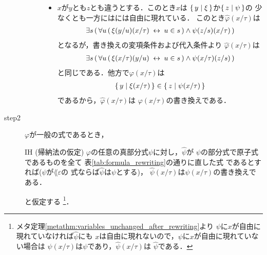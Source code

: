 \begin{metaprf}[第一]
\begin{description}
\begin{description}
\begin{itemize}
							\item $x$が$y$とも$z$とも違うとする．このとき$x$は
								$\{\, y \mid \xi\, \}$か$\{\, z \mid \psi\, \}$の
								少なくとも一方にはには自由に現れている．
								このとき$\widehat{\varphi}(x/\tau)$は
								\begin{align}
									\exists s\, (\, \forall u\, (\, \xi(y/u)(x/\tau) \hspace{0.25em}\leftrightarrow\hspace{0.25em} u \in s\, ) \wedge \psi(z/s)(x/\tau)\, )
								\end{align}
								となるが，書き換えの変項条件および代入条件より
								$\widehat{\varphi}(x/\tau)$は
								\begin{align}
									\exists s\, (\, \forall u\, (\, \xi(x/\tau)(y/u) \hspace{0.25em}\leftrightarrow\hspace{0.25em} u \in s\, ) \wedge \psi(x/\tau)(z/s)\, )
								\end{align}
								と同じである．他方で$\varphi(x/\tau)$は
								\begin{align}
									\{\, y \mid \xi(x/\tau)\, \} \in \{\, z \mid \psi(x/\tau)\, \}
								\end{align}
								であるから，$\widehat{\varphi}(x/\tau)$は
								$\varphi(x/\tau)$の書き換えである．
						\end{itemize}
				\end{description}
			
			\item[step2] $\varphi$が一般の式であるとき，
				\begin{itembox}[l]{IH (帰納法の仮定)}
					$\varphi$の任意の真部分式$\psi$に対し，$\widehat{\psi}$が
					$\psi$の部分式で原子式であるものを全て
					表\ref{tab:formula_rewriting}の通りに直した式
					であるとすれば($\psi$が$\lang{\varepsilon}$の
					式ならば$\widehat{\psi}$は$\psi$とする)，
					$\widehat{\psi}(x/\tau)$は$\psi(x/\tau)$の書き換えである．
				\end{itembox}
				と仮定する
				\footnote{
					メタ定理\ref{metathm:variables_unchanged_after_rewriting}より
					$\psi$に$x$が自由に現れていなければ$\widehat{\psi}$にも
					$x$は自由に現れないので，$\psi$に$x$が自由に現れていない場合は
					$\psi(x/\tau)$は$\psi$であり，$\widehat{\psi}(x/\tau)$は
					$\widehat{\psi}$である．
				}．
				

\end{description}
\end{metaprf}
